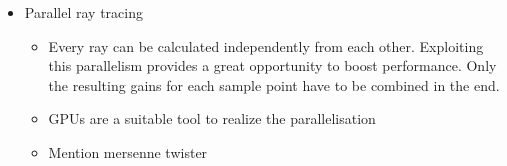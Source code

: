 \begin{itemize}
\begin{itemize}
    \end{itemize}
  \item Parallel ray tracing
    \begin{itemize}
      \item Every ray can be calculated independently from each other.
        Exploiting this parallelism provides a great opportunity to boost
        performance. Only the resulting gains for each sample point have to be
        combined in the end.
      \item GPUs are a suitable tool to realize the parallelisation
      \item Mention mersenne twister
    \end{itemize}
\end{itemize}
